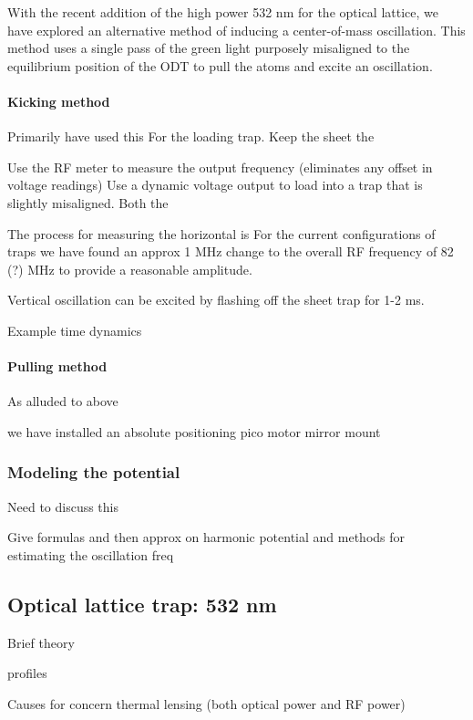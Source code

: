 With the recent addition of the high power 532 nm for the optical lattice, we have explored an alternative method of inducing a center-of-mass oscillation. This method uses a single pass of the green light purposely misaligned to the equilibrium position of the ODT to pull the atoms and excite an oscillation.

\paragraph{Kicking method}
Primarily have used this For the loading trap. Keep the sheet the 

Use the RF meter to measure the output frequency (eliminates any offset in voltage readings)
Use a dynamic voltage output to load into a trap that is slightly misaligned. Both the 

The process for measuring the horizontal is 
For the current configurations of traps we have found an approx 1 MHz change to the overall RF frequency of 82 (?) MHz to provide a reasonable amplitude. 

Vertical oscillation can be excited by flashing off the sheet trap for 1-2 ms. 

Example time dynamics

\paragraph{Pulling method}

As alluded to above

we have installed an absolute positioning pico motor mirror mount 

\subsubsection{Modeling the potential} \label{sssec:1064_modeling}

Need to discuss this

Give formulas and then approx on harmonic potential and methods for estimating the oscillation freq

\subsection{Optical lattice trap: 532 nm} \label{ssec:532sys}

Brief theory

profiles

Causes for concern
	thermal lensing (both optical power and RF power)
	

